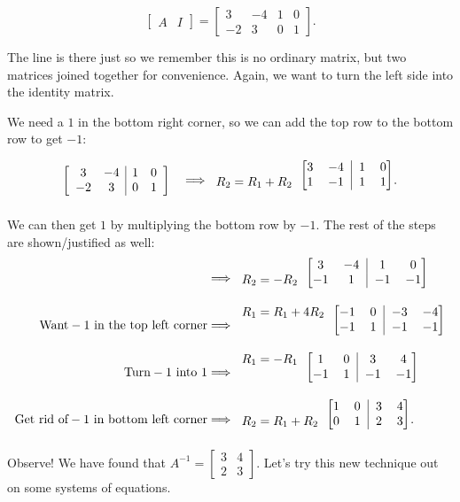 \documentclass[../gatm.tex]{subfiles}
\begin{document}
$$\left[\begin{array}{c|c}A & I \end{array}\right] = \left[\begin{array}{cc|cc} 3 & -4 & 1 & 0 \\ -2 & 3 & 0 & 1 \end{array}\right].$$

The line is there just so we remember this is no ordinary matrix, but two matrices joined together for convenience. Again, we want to turn the left side into the identity matrix.

We need a $1$ in the bottom right corner, so we can add the top row to the bottom row to get $-1$:

$$\left[\begin{array}{cc|cc} 3 & -4 & 1 & 0 \\ -2 & 3 & 0 & 1 \end{array}\right]\quad\Longrightarrow
\begin{blockarray}{c[cc|cc]}
& 3 & -4 & 1 & 0 \\ 
R_2=R_1+R_2 & 1 & -1 & 1 & 1
\end{blockarray}.$$

We can then get $1$ by multiplying the bottom row by $-1$. The rest of the steps are shown/justified as well:
\begin{align*}
&\Longrightarrow
\begin{blockarray}{c[cc|cc]}
& 3 & -4 & 1 & 0 \\ 
R_2=-R_2 & -1 & 1 & -1 & -1
\end{blockarray} \\
\text{Want}-1\text{ in the top left corner} &\Longrightarrow
\begin{blockarray}{c[cc|cc]}
R_1=R_1+4R_2 & -1 & 0 & -3 & -4 \\ 
& -1 & 1 & -1 & -1
\end{blockarray} \\
\text{Turn}-1\text{ into }1 &\Longrightarrow
\begin{blockarray}{c[cc|cc]}
R_1=-R_1 & 1 & 0 & 3 & 4 \\ 
& -1 & 1 & -1 & -1
\end{blockarray} \\
\text{Get rid of}-1\text{ in bottom left corner}&\Longrightarrow
\begin{blockarray}{c[cc|cc]}
& 1 & 0 & 3 & 4 \\ 
R_2=R_1+R_2 & 0 & 1 & 2 & 3
\end{blockarray}. \\
\end{align*}
Observe! We have found that $A^{-1}=\left[\begin{smallmatrix}3 & 4 \\ 2 & 3 \end{smallmatrix}\right]$. Let's try this new technique out on some systems of equations.
\end{document}
